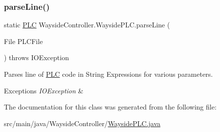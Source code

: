 \subsubsection{\texorpdfstring{parse\+Line()}{parseLine()}}
{\footnotesize\ttfamily static \hyperlink{classWaysideController_1_1PLC}{P\+LC} Wayside\+Controller.\+Wayside\+P\+L\+C.\+parse\+Line (\begin{DoxyParamCaption}\item[{File}]{P\+L\+C\+File }\end{DoxyParamCaption}) throws I\+O\+Exception\hspace{0.3cm}{\ttfamily [static]}}



Parses line of \hyperlink{classWaysideController_1_1PLC}{P\+LC} code in String Expressions for various parameters. 


\begin{DoxyExceptions}{Exceptions}
{\em I\+O\+Exception} & \\
\hline
\end{DoxyExceptions}


The documentation for this class was generated from the following file\+:\begin{DoxyCompactItemize}
\item 
src/main/java/\+Wayside\+Controller/\hyperlink{WaysidePLC_8java}{Wayside\+P\+L\+C.\+java}\end{DoxyCompactItemize}
